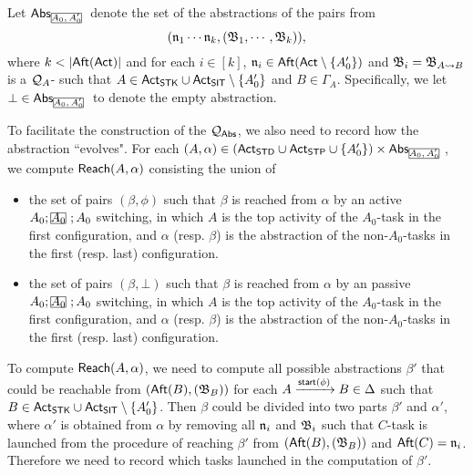 Let $\abs_{\mhcancel{A_0,A_0'}}$ denote the set of the abstractions of the pairs from $$(\mathfrak{n}_1\cdots\mathfrak{n}_k,({\mathfrak{B} }_1,\cdots,{\mathfrak{B} }_k)),$$ where $k<|\aft(\act)|$ and for each $i\in[k]$, $\mathfrak{n}_i\in{\sf Aft}({\sf Act}\setminus\{A_0'\})$ and ${\mathfrak{B} }_i = {\mathfrak{B} }_{A\rightsquigarrow B}$ is a ${\mathcal{Q} }_{A}$-{\WOTrNFA} such that $A\in{\sf Act}_{\mathsf{STK}}\cup{\sf Act}_{\mathsf{SIT}}\setminus\{A_0'\}$ and $B\in\Gamma_A$. Specifically, we let $\bot\in\abs_{\mhcancel{A_0,A_0'}}$ to denote the empty abstraction.

To facilitate the construction of the {\WOTrPDS} ${\mathcal{Q} }_{{\mathsf{Abs} }}$, we also need to record how the abstraction ``evolves". For each $(A, \alpha) \in (\act_{\standard}\cup\act_{\singletop}\cup\{A_0'\}) \times \abs_{\mhcancel{A_0,A_0'}}$, 
we compute ${\sf Reach}(A, \alpha)$ consisting the union of 
\begin{itemize}
    \item the set of pairs $(\beta,\phi)$ such that $\beta$ is reached from $\alpha$ by an active $A_0; \mhcancel{A_0}; A_0$ switching, in which $A$ is the top activity of the $A_0$-task in the first configuration, 
    and $\alpha$ (resp. $\beta$) is the abstraction of the non-$A_0$-tasks in the first (resp. last) configuration.
    \item the set of pairs $(\beta,\bot)$ such that $\beta$ is reached from $\alpha$ by an passive $A_0; \mhcancel{A_0}; A_0$ switching, in which $A$ is the top activity of the $A_0$-task in the first configuration,
    and $\alpha$ (resp. $\beta$) is the abstraction of the non-$A_0$-tasks in the first (resp. last) configuration.
\end{itemize}

To compute ${\sf Reach}(A,\alpha)$, we need to compute all possible abstractions $\beta'$ that could be reachable from $({\sf Aft}(B),({\mathfrak{B} }_{B}))$ for each $A\xrightarrow{{\mathsf{start} }(\phi)}B\in\Delta$ such that $B\in{\sf Act}_{\mathsf{STK}}\cup{\sf Act}_{\mathsf{SIT}}\setminus\{A_0'\}$. Then $\beta$ could be divided into two parts $\beta'$ and $\alpha'$, where $\alpha'$ is obtained from $\alpha$ by removing all $\mathfrak{n}_i$ and ${\mathfrak{B} }_i$ such that $C$-task is launched from the procedure of reaching $\beta'$ from $({\sf Aft}(B),({\mathfrak{B} }_{B}))$ and ${\sf Aft}(C) = \mathfrak{n}_i$. Therefore we need to record which tasks launched in the computation of $\beta'$.

